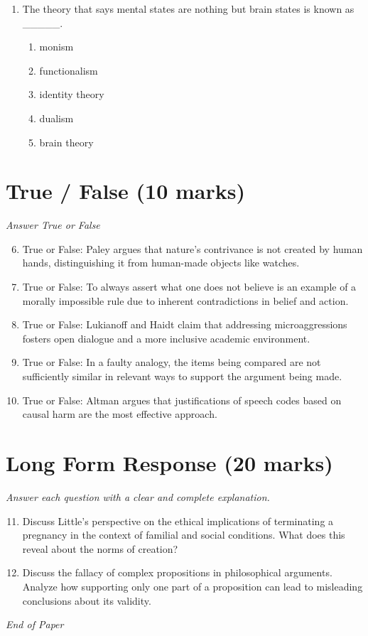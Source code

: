 \documentclass[12pt]{article}
\begin{document}
\begin{enumerate}[label=\arabic*.]
\begin{enumerate}[label=(\alph*)]
    \item jumping to a conclusion
    \item ad novitatem
\end{enumerate}
\item The theory that says mental states are nothing but brain states is known as \_\_\_\_\_.
\begin{enumerate}[label=(\alph*)]
    \item monism
    \item functionalism
    \item identity theory
    \item dualism
    \item brain theory
\end{enumerate}
\end{enumerate}

\section*{True / False (10 marks)}
\textit{Answer True or False}
\begin{enumerate}[label=\arabic*.]
\setcounter{enumi}{5}
\item True or False: Paley argues that nature's contrivance is not created by human hands, distinguishing it from human-made objects like watches.
\item True or False: To always assert what one does not believe is an example of a morally impossible rule due to inherent contradictions in belief and action.
\item True or False: Lukianoff and Haidt claim that addressing microaggressions fosters open dialogue and a more inclusive academic environment.
\item True or False: In a faulty analogy, the items being compared are not sufficiently similar in relevant ways to support the argument being made.
\item True or False: Altman argues that justifications of speech codes based on causal harm are the most effective approach.
\end{enumerate}

\section*{Long Form Response (20 marks)}
\textit{Answer each question with a clear and complete explanation.}
\begin{enumerate}[label=\arabic*.]
\setcounter{enumi}{10}
\item Discuss Little's perspective on the ethical implications of terminating a pregnancy in the context of familial and social conditions. What does this reveal about the norms of creation?
\item Discuss the fallacy of complex propositions in philosophical arguments. Analyze how supporting only one part of a proposition can lead to misleading conclusions about its validity.
\end{enumerate}

\vfill
\noindent\textit{End of Paper}
\end{document}
